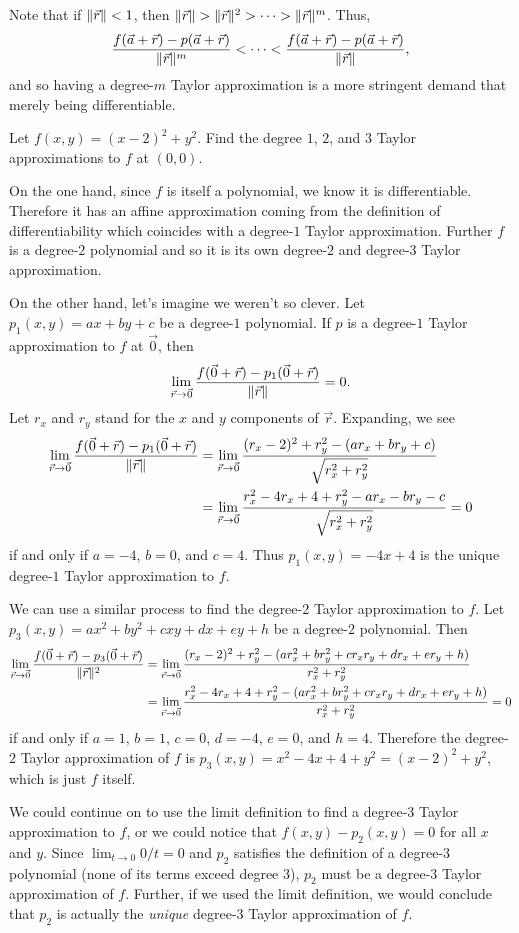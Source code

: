 Note that if $\lVert\vec r\rVert<1$, then $\lVert\vec r\rVert > \lVert\vec r\rVert^2> \cdots >\lVert\vec r\rVert^m$.
Thus, 
\[
	\frac{f(\vec a+\vec r)-p(\vec a+\vec r)}{\lVert\vec r\rVert^m}<\cdots<
\frac{f(\vec a+\vec r)-p(\vec a+\vec r)}{\lVert\vec r\rVert},
\]
and so having a degree-$m$ Taylor approximation is a more stringent demand that merely being
differentiable.

\begin{example}
	Let $f(x,y)=(x-2)^2+y^2$.  Find the degree $1$, $2$, and $3$ Taylor
	approximations to $f$ at $(0,0)$.

	On the one hand, since $f$ is itself a polynomial, we know it is differentiable.  
	Therefore it has an affine approximation coming from the definition of differentiability
	which coincides with a degree-$1$ Taylor approximation.  Further $f$ is a degree-$2$
	polynomial and so it is its own degree-$2$ and degree-$3$ Taylor approximation.

	On the other hand, let's imagine we weren't so clever.  Let $p_1(x,y)=ax+by+c$
	be a degree-$1$ polynomial.  If $p$ is a degree-$1$ Taylor approximation to $f$
	at $\vec 0$, then
	\[
		\lim_{\vec r\to \vec 0} \frac{f(\vec 0+\vec r)-p_1(\vec 0+\vec r)}{\lVert\vec r\rVert}=0.
	\]
	Let $r_x$ and $r_y$ stand for the $x$ and $y$ components of $\vec r$.
	Expanding, we see
	\begin{align*}
		\lim_{\vec r\to \vec 0} \frac{f(\vec 0+\vec r)-p_1(\vec 0+\vec r)}{\lVert\vec r\rVert}&=
		\lim_{\vec r\to \vec 0} \frac{(r_x-2)^2+r_y^2 -(ar_x+br_y+c)}{\sqrt{r_x^2+r_y^2}}\\
		&=\lim_{\vec r\to \vec 0} \frac{r_x^2-4r_x+4+r_y^2 -ar_x-br_y-c}{\sqrt{r_x^2+r_y^2}}=0
	\end{align*}
	if and only if $a=-4$, $b=0$, and $c=4$.  Thus $p_1(x,y)=-4x+4$ is the unique degree-$1$
	Taylor approximation to $f$.

	We can use a similar process to find the degree-$2$ Taylor approximation to $f$.
	Let $p_3(x,y)=ax^2+by^2+cxy+dx+ey+h$ be a degree-$2$ polynomial.  Then
	\begin{align*}
		\lim_{\vec r\to \vec 0} \frac{f(\vec 0+\vec r)-p_3(\vec 0+\vec r)}{\lVert\vec r\rVert^2}&=
		\lim_{\vec r\to \vec 0} \frac{(r_x-2)^2+r_y^2 -(ar_x^2+br_y^2+cr_xr_y+dr_x+er_y+h)}{r_x^2+r_y^2}\\
		&=\lim_{\vec r\to \vec 0} \frac{r_x^2-4r_x+4+r_y^2 -(ar_x^2+br_y^2+cr_xr_y+dr_x+er_y+h)}{r_x^2+r_y^2}=0
	\end{align*}
	if and only if $a=1$, $b=1$, $c=0$, $d=-4$, $e=0$, and $h=4$.  Therefore
	the degree-$2$ Taylor approximation of $f$ is $p_3(x,y)=x^2-4x+4+y^2=(x-2)^2+y^2$, which
	is just $f$ itself.

	We could continue on to use the limit definition to find a degree-$3$ Taylor
	approximation to $f$, or we could notice that $f(x,y)-p_2(x,y)=0$ for all $x$ and $y$.
	Since $\lim_{t\to0} 0/t=0$ and $p_2$ satisfies the definition of a degree-$3$ polynomial
	(none of its terms exceed degree $3$), $p_2$ must be a degree-$3$ Taylor approximation
	of $f$.  Further, if we used the limit definition, we would conclude that $p_2$ is
	actually the \emph{unique} degree-$3$ Taylor approximation of $f$.
\end{example}


